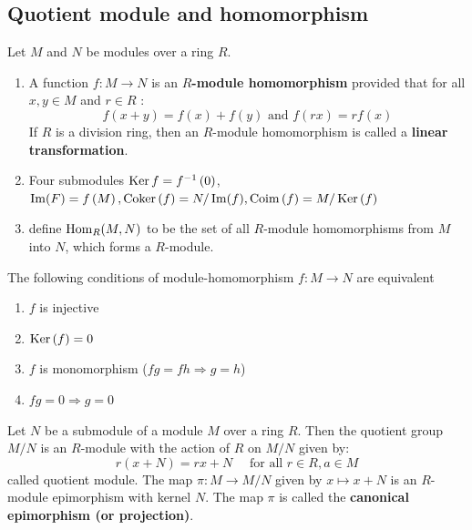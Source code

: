 \subsection{Quotient module and homomorphism} %


\begin{definition}
    Let $M$ and $N$ be modules over a ring $R$.
    \begin{enumerate}
        \item
              A function $  {f}:   M \rightarrow   N$ is an \textbf{${R}$-module homomorphism} provided that for all $ x,y \in  M$ and $  {r} \in  {R}$ :
              \begin{equation*}
                  f(x+y)=
                  f(x)+  {f}(y)
                  \text { and }
                  {f}(  {rx})=  {rf}(  {x})
              \end{equation*}
              If $R$ is a division ring, then an $R$-module homomorphism is called a \textbf{linear transformation}.
        \item Four submodules
              $\operatorname{\operatorname{Ker}} f=f^{-1}\left(0\right)$, $\Im(F)=f\left(M\right),\operatorname{\operatorname{Coker}}\left( f \right)=N/\Im(f),\operatorname{\operatorname{Coim}}\left( f \right)=M/\operatorname{\operatorname{Ker}}\left( f \right)$
        \item
              define $\operatorname{\operatorname{Hom}}_R(M, N)$ to be the set of all $R$-module homomorphisms from $M$ into $N$, which forms a $R$-module.
    \end{enumerate}
\end{definition}
\begin{proposition}
    The following conditions of module-homomorphism $f:M\rightarrow N$ are equivalent
    \begin{enumerate}
        \item $f$ is injective
        \item $\operatorname{\operatorname{Ker}}\left( f \right)=0$
        \item $f$ is monomorphism ($fg=fh\Rightarrow g=h$)
        \item $fg=0\Rightarrow g=0$
    \end{enumerate}
\end{proposition}



\begin{definition}
    Let $N$ be a submodule of a module $M$ over a ring $R$.
    Then the quotient group $ M / N$ is an $R$-module with the action of $R$ on $ M / N$ given by:
    \begin{equation*}
        {r}(  x+ N )
        =
        rx + N \quad \text { for all }   {r} \in   {R},   {a} \in   M
    \end{equation*}
    called quotient module.
    The map $\pi:   M \rightarrow   M /  N$ given by $ x \mapsto   x+  N$ is an $R$-module epimorphism with kernel $N$.
    The map $\pi$ is called the \textbf{canonical epimorphism (or projection)}.
\end{definition}


